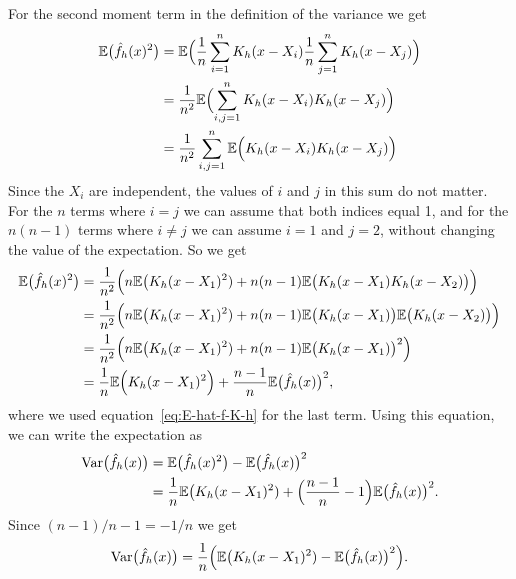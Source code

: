 \documentclass[
  a4paper,
]{article}
\theoremstyle{definition}
\theoremstyle{definition}
\theoremstyle{definition}
\theoremstyle{definition}
\theoremstyle{remark}
\begin{document}
For the second moment term in the definition of the variance we get
\begin{align*}
  \mathbb{E}\bigl( \hat f_h(x)^2 \bigr)
  &= \mathbb{E}\Bigl( \frac{1}{n} \sum_{i=1}^n K_h(x - X_i) \frac{1}{n} \sum_{j=1}^n K_h(x - X_j) \Bigr) \\
  &= \frac{1}{n^2} \mathbb{E}\Bigl( \sum_{i,j=1}^n K_h(x - X_i) K_h(x - X_j) \Bigr) \\
  &= \frac{1}{n^2} \sum_{i,j=1}^n \mathbb{E}\Bigl( K_h(x - X_i) K_h(x - X_j) \Bigr)
\end{align*}
Since the \(X_i\) are independent, the values of \(i\) and \(j\) in this sum do not
matter. For the \(n\) terms where \(i=j\) we can assume that both indices equal
1, and for the \(n(n-1)\) terms where \(i\neq j\) we can assume \(i=1\) and \(j=2\),
without changing the value of the expectation. So we get
\begin{align*}
  \mathbb{E}\bigl( \hat f_h(x)^2 \bigr)
  &= \frac{1}{n^2} \Bigl( n \mathbb{E}\bigl( K_h(x - X_1)^2 ) + n(n-1) \mathbb{E}\bigl( K_h(x - X_1) K_h(x - X_2) \bigr) \Bigr) \\
  &= \frac{1}{n^2} \Bigl( n \mathbb{E}\bigl( K_h(x - X_1)^2 ) + n(n-1) \mathbb{E}\bigl( K_h(x - X_1) \bigr) \mathbb{E}\bigl( K_h(x - X_2) \bigr) \Bigr) \\
  &= \frac{1}{n^2} \Bigl( n \mathbb{E}\bigl( K_h(x - X_1)^2 ) + n(n-1) \mathbb{E}\bigl( K_h(x - X_1) \bigr)^2 \Bigr) \\
  &= \frac{1}{n} \mathbb{E}\Bigl( K_h(x - X_1)^2 \Bigr) + \frac{n-1}{n} \mathbb{E}\bigl( \hat f_h(x) \bigr)^2,
\end{align*}
where we used equation~\eqref{eq:E-hat-f-K-h} for the last term.
Using this equation, we can write the expectation as
\begin{align*}
  \mathop{\mathrm{Var}}\bigl( \hat f_h(x) \bigr)
  &= \mathbb{E}\bigl( \hat f_h(x)^2 \bigr) - \mathbb{E}\bigl( \hat f_h(x) \bigr)^2 \\
  &= \frac{1}{n} \mathbb{E}\bigl( K_h(x - X_1)^2 ) + \Bigl(\frac{n-1}{n} - 1\Bigr) \mathbb{E}\bigl( \hat f_h(x) \bigr)^2.
\end{align*}
Since \((n-1)/n - 1 = -1/n\) we get
\begin{equation}
  \mathop{\mathrm{Var}}\bigl( \hat f_h(x) \bigr)
  = \frac{1}{n} \Bigl( \mathbb{E}\bigl( K_h(x - X_1)^2 ) - \mathbb{E}\bigl( \hat f_h(x) \bigr)^2 \Bigr).
                                                          \label{eq:Var-hat-f-2}
\end{equation}
\end{document}
